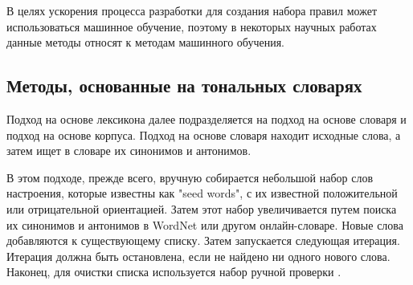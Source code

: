 В целях ускорения процесса разработки для создания набора правил может
использоваться машинное обучение, поэтому в некоторых научных работах
\cite{article16} \cite{article17} данные методы относят к методам машинного
обучения.

\subsection{Методы, основанные на тональных словарях}

Подход на основе лексикона далее подразделяется на подход на основе словаря и
подход на основе корпуса. Подход на основе словаря находит исходные слова, а
затем ищет в словаре их синонимов и антонимов.\cite{article2}

В этом подходе, прежде всего, вручную собирается небольшой набор слов
настроения, которые известны как "seed words", с их известной положительной или
отрицательной ориентацией. Затем этот набор увеличивается путем поиска их
синонимов и антонимов в WordNet или другом онлайн-словаре.  Новые слова
добавляются к существующему списку. Затем запускается следующая итерация.
Итерация должна быть остановлена, если не найдено ни одного нового слова.
Наконец, для очистки списка используется набор ручной проверки \cite{article4}.


